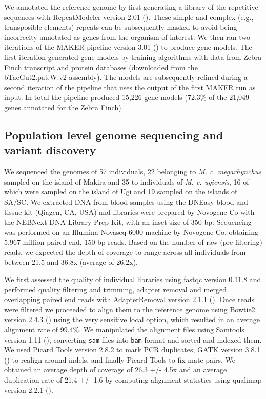 We annotated the reference genome by first generating a library of the repetitive sequences with RepeatModeler version 2.01 (\cite{flynn2020repeatmodeler2}). These simple and complex (e.g., transposible elements) repeats can be subsequently masked to avoid being incorreclty annotated as genes from the organism of interest. We then ran two iterations of the MAKER pipeline version 3.01 (\cite{cantarel2008maker}) to produce gene models. The first iteration generated gene models by training algorithms with data from Zebra Finch transcript and protein databases (downloaded from the bTaeGut2.pat.W.v2 assembly). The models are subsequently refined during a second iteration of the pipeline that uses the output of the first MAKER run as input. In total the pipeline produced 15,226 gene models (72.3\% of the 21,049 genes annotated for the Zebra Finch).

\subsection{Population level genome sequencing and variant discovery}
We sequenced the genomes of 57 individuals, 22 belonging to \textit{M. c. megarhynchus} sampled on the island of Makira and 35 to individuals of \textit{M. c. ugiensis}, 16 of which were sampled on the island of Ugi and 19 sampled on the islands of SA/SC. We extracted DNA from blood samples using the DNEasy blood and tissue kit (Qiagen, CA, USA) and libraries were prepared by Novogene Co with the NEBNext DNA Library Prep Kit, with an inset size of 350 bp. Sequencing was performed on an Illumina Novaseq 6000 machine by Novogene Co, obtaining 5,967 million paired end, 150 bp reads. Based on the number of raw (pre-filtering) reads, we expected the depth of coverage to range across all individuals from between 21.5 and 36.8x (average of 26.2x).

We first assessed the quality of individual libraries using \href{http://www.bioinformatics.babraham.ac.uk/projects/fastqc}{fastqc version 0.11.8} and performed quality filtering and trimming, adapter removal and merged overlapping paired end reads with AdapterRemoval version 2.1.1 (\cite{schubert2016adapterremoval}). Once reads were filtered we proceeded to align them to the reference genome using Bowtie2 version 2.4.3 (\cite{langmead2012fast}) using the very sensitive local option, which resulted in an average alignment rate of 99.4\%. We manipulated the alignment files using Samtools version 1.11 (\cite{li2009sequence}), converting \texttt{sam} files into \texttt{bam} format and sorted and indexed them. We used \href{http://broadinstitute.github.io/picard/}{Picard Tools version 2.8.2} to mark PCR duplicates, GATK version 3.8.1 (\cite{van2020genomics}) to realign around indels, and finally Picard Tools to fix mate-pairs. We obtained an average depth of coverage of 26.3 +/- 4.5x and an average duplication rate of 21.4 +/- 1.6 by computing alignment statistics using qualimap version 2.2.1 (\cite{garcia2012qualimap}).


